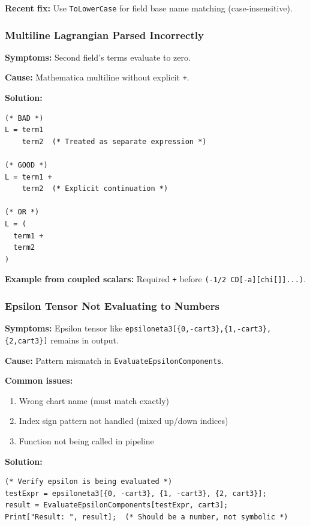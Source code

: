 \textbf{Recent fix:} Use \texttt{ToLowerCase} for field base name matching (case-insensitive).

\subsubsection{Multiline Lagrangian Parsed Incorrectly}

\textbf{Symptoms:} Second field's terms evaluate to zero.

\textbf{Cause:} Mathematica multiline without explicit \texttt{+}.

\textbf{Solution:}

\begin{lstlisting}[style=mathematica]
(* BAD *)
L = term1
    term2  (* Treated as separate expression *)

(* GOOD *)
L = term1 +
    term2  (* Explicit continuation *)

(* OR *)
L = (
  term1 +
  term2
)
\end{lstlisting}

\textbf{Example from coupled scalars:} Required \texttt{+} before \texttt{(-1/2 CD[-a][chi[]]...)}.

\subsubsection{Epsilon Tensor Not Evaluating to Numbers}

\textbf{Symptoms:} Epsilon tensor like \texttt{epsiloneta3[\{0,-cart3\},\{1,-cart3\},\{2,cart3\}]} remains in output.

\textbf{Cause:} Pattern mismatch in \texttt{EvaluateEpsilonComponents}.

\textbf{Common issues:}

\begin{enumerate}
  \item Wrong chart name (must match exactly)
  \item Index sign pattern not handled (mixed up/down indices)
  \item Function not being called in pipeline
\end{enumerate}

\textbf{Solution:}

\begin{lstlisting}[style=mathematica]
(* Verify epsilon is being evaluated *)
testExpr = epsiloneta3[{0, -cart3}, {1, -cart3}, {2, cart3}];
result = EvaluateEpsilonComponents[testExpr, cart3];
Print["Result: ", result];  (* Should be a number, not symbolic *)
\end{lstlisting}

